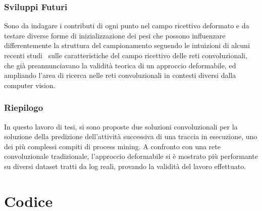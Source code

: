 \documentclass[12pt,a4paper]{report}
\begin{document}
    \subsection{Sviluppi Futuri}
    Sono da indagare i contributi di ogni punto nel campo ricettivo deformato e da 
    testare diverse forme di inizializzazione dei pesi che possono influenzare 
    differentemente la struttura del campionamento seguendo le intuizioni di alcuni 
    recenti studi~\cite{luo2017understanding} sulle caratteristiche del campo 
    ricettivo delle reti convoluzionali, che gi\`a preannunciavano la validit\`a 
    teorica di un approccio deformabile, ed ampliando l'area di ricerca nelle
    reti convoluzionali in contesti diversi dalla computer vision. 

    \subsection{Riepilogo}
    In questo lavoro di tesi, si sono proposte due soluzioni convoluzionali
    per la soluzione della predizione dell'attivit\`a successiva di una
    traccia in esecuzione, uno dei pi\`u complessi compiti di process mining.
    A confronto con una rete convoluzionale tradizionale, l'approccio deformabile
    si \`e mostrato pi\`u performante su diversi dataset tratti da log reali, 
    provando la validit\`a del lavoro effettuato.

    \appendix
    \chapter{Codice}
\end{document}
